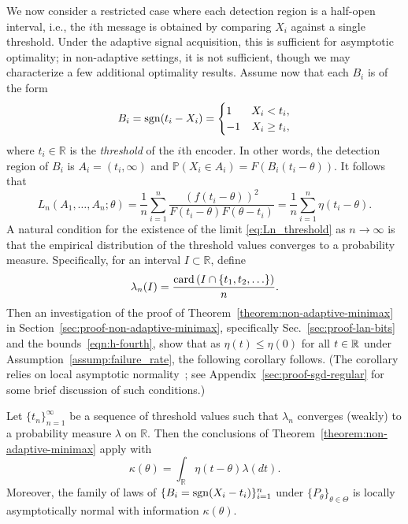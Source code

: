 We now consider a restricted case where each detection region is a
half-open interval, i.e., the $i$th message is obtained by comparing $X_i$
against a single threshold. Under the adaptive signal acquisition,
this is sufficient for asymptotic optimality;
in non-adaptive settings, it is not sufficient, though we may characterize
a few additional optimality results.
Assume now that each $B_i$ is of the form
\begin{equation}
  \label{eq:threshold_message}
  B_i = \mathrm{sgn}(t_i - X_i) = \begin{cases} 1 & X_i<  t_i, \\
    -1 & X_i \geq t_i,
  \end{cases}  
\end{equation}
where $t_i\in\mathbb R$ is the \emph{threshold} of the $i$th encoder. In
other words, the detection region of $B_i$ is $A_i = (t_i,\infty)$ and
$\mathbb P(X_i \in A_i) = F \left( B_i(t_i-\theta) \right)$. It follows that
\begin{equation}
  L_n(A_1,\ldots,A_n;\theta)
  = \frac{1}{n} \sum_{i=1}^n \frac{ \left(f(t_i-\theta) \right)^2 }{F\left(t_i-\theta \right) F\left(\theta - t_i \right) }  = \frac{1}{n} \sum_{i=1}^n \eta(t_i - \theta).
  \label{eq:Ln_threshold}
\end{equation}
A natural condition for the existence of the limit \eqref{eq:Ln_threshold}
as $n\to \infty$ is that the empirical distribution of the threshold values
converges to a probability measure. Specifically, for an interval $I \subset
\mathbb R$, define
\begin{equation*}
  \lambda_n(I) = \frac{ \mathrm{card} \left( I \cap \{t_1,t_2,\ldots \} \right)}{n}. 
\end{equation*}
Then an investigation of the proof of
Theorem~\ref{theorem:non-adaptive-minimax} in
Section~\ref{sec:proof-non-adaptive-minimax}, specifically
Sec.~\ref{sec:proof-lan-bits} and the bounds~\eqref{eqn:h-fourth}, show that
as $\eta(t) \le \eta(0)$ for all $t \in \mathbb{R}$ under
Assumption~\ref{assump:failure_rate}, the following corollary follows. (The
corollary relies on local asymptotic normality~\cite[Ch.~7]{VanDerVaart98};
see Appendix~\ref{sec:proof-sgd-regular} for some brief discussion of such
conditions.)
\begin{cor} \label{cor:LAN_thresh}
  Let $\{t_n\}_{n=1}^\infty$ be a sequence of threshold values such that
  $\lambda_n$ converges (weakly) to a probability measure $\lambda$ on
  $\mathbb R$. Then the conclusions of
  Theorem~\ref{theorem:non-adaptive-minimax} apply with
  \begin{equation*}
    \kappa(\theta) = \int_{\mathbb R} \eta(t-\theta) \lambda(dt). 
  \end{equation*}
  Moreover, the family of laws of $\{B_i = \mathrm{sgn}(X_i - t_i)\}_{i = 1}^n$
  under $\{P_\theta\}_{\theta \in \Theta}$ is locally asymptotically normal
  with information $\kappa(\theta)$.
\end{cor}

